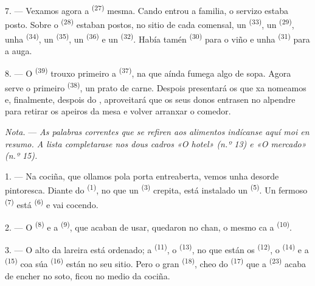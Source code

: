 7. --- Vexamos agora a  \textsuperscript{(27)} mesma. Cando entrou a
familia, o servizo estaba posto. Sobre o  \textsuperscript{(28)} estaban
postos, no sitio de cada comensal, un  \textsuperscript{(33)}, un
 \textsuperscript{(29)}, unha
 \textsuperscript{(34)}, un  \textsuperscript{(35)}, un
 \textsuperscript{(36)} e un  \textsuperscript{(32)}.
Había tamén  \textsuperscript{(30)} para o viño e unha
 \textsuperscript{(31)} para a auga.

8. --- O  \textsuperscript{(39)} trouxo primeiro a 
\textsuperscript{(37)}, na que aínda fumega algo de sopa. Agora serve o primeiro
 \textsuperscript{(38)}, un prato de carne. Despois presentará os que xa
nomeamos e, finalmente, despois do , aproveitará que os seus donos
entrasen no alpendre para retirar os apeiros da mesa e volver arranxar o comedor.

\textit{Nota.} --- \textit{As palabras correntes que se refiren aos alimentos indícanse aquí
moi en resumo. A lista completarase nos dous cadros «O hotel» (n.º 13) e «O mercado» (n.º
15).}

\VUsaut{4.6mm}
\VUsaut{3.0mm}

1. --- Na cociña, que ollamos pola porta entreaberta, vemos unha desorde pintoresca. Diante do
 \textsuperscript{(1)}, no que un  \textsuperscript{(3)} crepita,
está instalado un  \textsuperscript{(5)}. Un fermoso 
\textsuperscript{(7)} está
 \textsuperscript{(6)} e vai cocendo.

2. --- O  \textsuperscript{(8)} e a  \textsuperscript{(9)},
que acaban de usar, quedaron no chan, o mesmo ca a
 \textsuperscript{(10)}.

3. --- O alto da lareira está ordenado; a  \textsuperscript{(11)}, o
 \textsuperscript{(13)}, no que están os 
\textsuperscript{(12)}, o  \textsuperscript{(14)} e a
 \textsuperscript{(15)} coa súa 
\textsuperscript{(16)} están no seu sitio. Pero o gran 
\textsuperscript{(18)}, cheo do  \textsuperscript{(17)} que a
 \textsuperscript{(23)} acaba de encher no soto, ficou no medio da
cociña.

